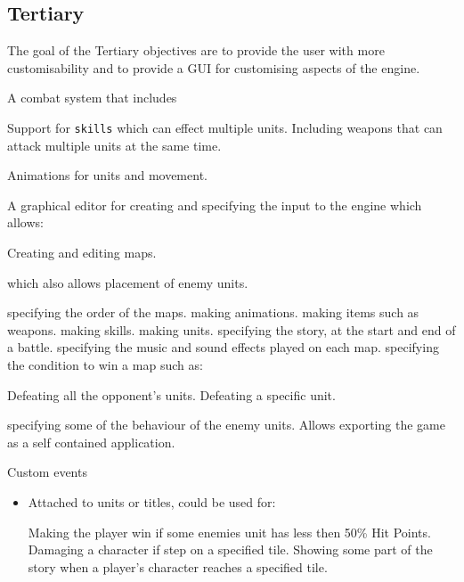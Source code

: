 \subsection{Tertiary} 
\label{tertiary}
The goal of the Tertiary objectives are to provide the user with more customisability and to provide a GUI for customising aspects of the engine. 

\begin{itemize}
	
	\tick A combat system that includes 
	\begin{itemize}
		\tick Support for \texttt{skills} which can effect multiple units.
		\tick Including weapons that can attack multiple units at the same time. 
	\end{itemize}
	
	\tick Animations for units and movement.
	
	\tick A graphical editor for  creating and specifying the input to the engine which allows:
	\begin{itemize}
		\tick   Creating and editing maps.
		\begin{itemize}
			\tick which also allows placement of enemy units.
		\end{itemize}
		
		\tick   specifying the order of the maps.
		\tick   making animations.
		\tick   making items such as weapons.
		\tick   making skills. 
		\tick   making units.
		\tick   specifying the story, at the start and end of a battle.
		\tick   specifying the music and sound effects played on each map.
		\tick   specifying the condition to win a map such as:
		 \begin{itemize}
		 	\tick Defeating all the opponent's units.
		 	\tick Defeating a specific unit.
		 \end{itemize}
		\tick   specifying some of the behaviour of the enemy units.
		\tick   Allows exporting the game as a self contained application.
	\end{itemize}
	
	\cross Custom events
	\begin{itemize}
		\item Attached to units or titles, could be used for:
		\begin{itemize}
			\cross Making the player win if some enemies unit has less then 50\% Hit Points.
			\cross Damaging a character if step on a specified tile.
			\cross Showing some part of the story when a player's character reaches a specified tile.
		\end{itemize}
	\end{itemize}
	
\end{itemize}